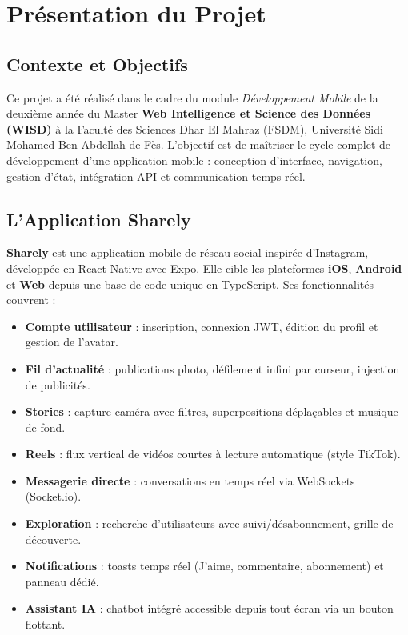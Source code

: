 \chapter{Présentation du Projet}

\section{Contexte et Objectifs}

Ce projet a été réalisé dans le cadre du module \textit{Développement Mobile} de la deuxième année du Master \textbf{Web Intelligence et Science des Données (WISD)} à la Faculté des Sciences Dhar El Mahraz (FSDM), Université Sidi Mohamed Ben Abdellah de Fès. L'objectif est de maîtriser le cycle complet de développement d'une application mobile : conception d'interface, navigation, gestion d'état, intégration API et communication temps réel.

\section{L'Application Sharely}

\textbf{Sharely} est une application mobile de réseau social inspirée d'Instagram, développée en React Native avec Expo. Elle cible les plateformes \textbf{iOS}, \textbf{Android} et \textbf{Web} depuis une base de code unique en TypeScript. Ses fonctionnalités couvrent :

\begin{itemize}
  \item \textbf{Compte utilisateur} : inscription, connexion JWT, édition du profil et gestion de l'avatar.
  \item \textbf{Fil d'actualité} : publications photo, défilement infini par curseur, injection de publicités.
  \item \textbf{Stories} : capture caméra avec filtres, superpositions déplaçables et musique de fond.
  \item \textbf{Reels} : flux vertical de vidéos courtes à lecture automatique (style TikTok).
  \item \textbf{Messagerie directe} : conversations en temps réel via WebSockets (Socket.io).
  \item \textbf{Exploration} : recherche d'utilisateurs avec suivi/désabonnement, grille de découverte.
  \item \textbf{Notifications} : toasts temps réel (J'aime, commentaire, abonnement) et panneau dédié.
  \item \textbf{Assistant IA} : chatbot intégré accessible depuis tout écran via un bouton flottant.
\end{itemize}

